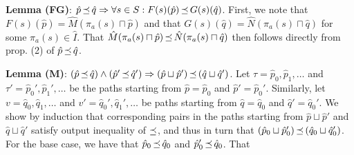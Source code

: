 \textbf{Lemma (FG)}: $\hat p \operatorname{\mathrel{\preceq}} \hat q \Rightarrow \forall s \in S : F(s)(\hat p) \operatorname{\mathrel{\preceq}} G(s)(\hat q)$. First, we note that $F(s)(\hat p) = \hat M(\pi_{a}(s) \sqcap \hat p)$ and that $G(s)(\hat q) = \hat N(\pi_{a}(s) \sqcap \hat q)$ for some $\pi_{a}(s) \in \hat I$. That $\hat M(\pi_{a}(s) \sqcap \hat p) \operatorname{\mathrel{\preceq}} \hat N(\pi_{a}(s) \sqcap \hat q)$ then follows directly from prop. (2) of $\hat p \operatorname{\mathrel{\preceq}} \hat q$.




\textbf{Lemma (M)}: $(\hat p \operatorname{\mathrel{\preceq}} \hat q) \wedge (\hat p' \operatorname{\mathrel{\preceq}} \hat q') \Rightarrow (\hat p \sqcup \hat p') \operatorname{\mathrel{\preceq}} \, (\hat q \sqcup \hat q')$. Let $\tau = \hat p_{0}, \hat p_{1}, \ldots$ and $\tau' = \hat p_{0}', \hat p_{1}', \ldots$ be the paths starting from $\hat p = \hat p_{0}$ and $\hat p' = \hat p_{0}'$. Similarly, let $v = \hat q_{0}, \hat q_{1}, \ldots$ and $v' = \hat q_{0}', \hat q_{1}', \ldots$ be paths starting from $\hat q = \hat q_{0}$ and $\hat q' = \hat q_{0}'$. We show by induction that corresponding pairs in the paths starting from $\hat p \sqcup \hat p'$ and $\hat q \sqcup \hat q'$ satisfy output inequality of $\operatorname{\mathrel{\preceq}}$, and thus in turn that $(\hat p_{0} \sqcup \hat p_{0}') \operatorname{\mathrel{\preceq}} \, (\hat q_{0} \sqcup \hat q_{0}')$. For the base case, we have that $\hat p_{0} \operatorname{\mathrel{\preceq}} \hat q_{0}$ and $\hat p_{0}' \operatorname{\mathrel{\preceq}} \hat q_{0}$. That 


